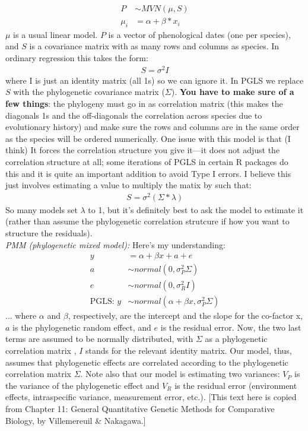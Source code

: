 \documentclass[11pt,letter]{article}
\begin{document}
\begin{align}
P & \sim MVN(\mu, S)\\
\mu_i & = \alpha +  \beta*x_i
\end{align}
$\mu$ is a usual linear model. $P$ is a vector of phenological dates (one per species), and $S$ is a covariance matrix with as many rows and columns as species. In ordinary regression this takes the form:
\begin{align}
S = \sigma^2I
\end{align}
where I is just an identity matrix (all 1s) so we can ignore it. In PGLS we replace $S$ with the phylogenetic covariance matrix ($\Sigma$). {\bf You have to make sure of a few things}: the phylogeny must go in as correlation matrix (this makes the diagonals 1s and the off-diagonals the correlation across species due to evolutionary history) and make sure the rows and columns are in the same order as the species will be ordered numerically. One issue with this model is that (I think) It forces the correlation structure you give it---it does not adjust the correlation structure at all; some iterations of PGLS in certain R packages do this and it is quite an important addition to avoid Type I errors. I believe this just involves estimating a value to multiply the matix by such that:
\begin{align}
S = \sigma^2(\Sigma*\lambda)
\end{align}
So many models set $\lambda$ to 1, but it's definitely best to ask the model to estimate it (rather than assume the phylogenetic correlation strutcure if how you want to structure the residuals). \\

\emph{PMM (phylogenetic mixed model):} Here's my understanding:\\

\begin{align}
y & = \alpha + \beta x + a + e\\
a & \sim normal(0, \sigma_P^2\Sigma)\\
e & \sim normal(0, \sigma_R^2I)\\
\text{PGLS: }y & \sim normal(\alpha + \beta x, \sigma_P^2\Sigma)
\end{align}
... where $\alpha$ and $\beta$, respectively, are the intercept and the slope for the co-factor x, $a$ is the phylogenetic random effect, and $e$ is the residual error. Now, the two last terms are assumed to be normally distributed, with $\Sigma$ as a phylogenetic correlation matrix , $I$ stands for the relevant identity matrix. Our model, thus, assumes that phylogenetic effects are correlated according to the phylogenetic correlation matrix $\Sigma$. Note also that our model is estimating two variances: $V_P$ is the variance of the phylogenetic effect and $V_R$ is the residual error (environment effects, intraspecific variance, measurement error, etc.). [This text here is copied from Chapter 11: General Quantitative Genetic Methods for Comparative Biology, by Villemereuil \& Nakagawa.]\\
\end{document}
